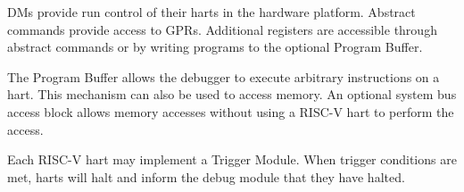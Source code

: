 DMs provide run control of their harts in the hardware platform. Abstract commands
provide access to GPRs. Additional registers are accessible through abstract
commands or by writing programs to the optional Program Buffer.

The Program Buffer allows the debugger to execute arbitrary instructions on a
hart. This mechanism can also be used to access memory.  An optional system bus
access block allows memory accesses without using a RISC-V hart to perform the
access.

Each RISC-V hart may implement a Trigger Module. When trigger conditions
are met, harts will halt and inform the debug module that they have
halted.

